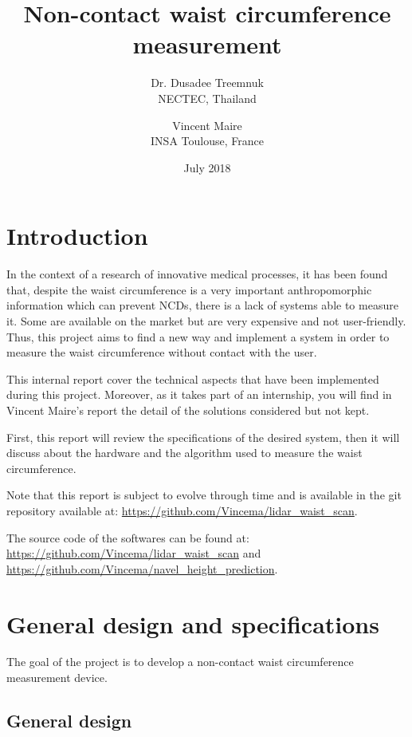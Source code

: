 \documentclass{article}
\title{Non-contact waist circumference measurement}
\author{ Dr. Dusadee Treemnuk \\
         NECTEC, Thailand
         \and
         Vincent Maire\\
         INSA Toulouse, France }
\date{July 2018}
\newcommand{\vsp}{\vspace{\baselineskip}}
\begin{document}
\maketitle

\section*{Introduction}

In the context of a research of innovative medical processes, it has been found that, despite the waist circumference is a very important anthropomorphic information which can prevent NCDs, there is a lack of systems able to measure it. Some are available on the market but are very expensive and not user-friendly. Thus, this project aims to find a new way and implement a system in order to measure the waist circumference without contact with the user. 

\vsp

This internal report cover the technical aspects that have been implemented during this project. Moreover, as it takes part of an internship, you will find in Vincent Maire's report \cite{MAIRE_internship_report} the detail of the solutions considered but not kept.  

\vsp

First, this report will review the specifications of the desired system, then it will discuss about the hardware and the algorithm used to measure the waist circumference.

\vsp

Note that this report is subject to evolve through time and is available in the git repository available at: \url{https://github.com/Vincema/lidar_waist_scan}. 

\vsp

The source code of the softwares can be found at: \url{https://github.com/Vincema/lidar_waist_scan}
and 
\url{https://github.com/Vincema/navel_height_prediction}.

\newpage
\tableofcontents
\newpage

\section{General design and specifications}

The goal of the project is to develop a non-contact waist circumference measurement device.

\subsection{General design} \label{sec:general_design}
\end{document}
